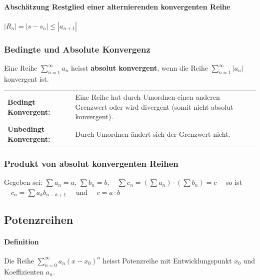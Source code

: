 \paragraph{Abschätzung Restglied einer alternierenden konvergenten Reihe}\qquad $|R_n| = |s-s_n|\leq |a_{n+1}|$


\subsubsection{Bedingte und Absolute Konvergenz}
Eine Reihe $\sum\limits_{n=1}^{\infty}a_n$ heisst \textbf{absolut konvergent}, wenn die
Reihe $\sum\limits_{n=1}^{\infty}|a_n|$ konvergent ist.\\

\begin{tabular}{ p{4.5cm}  p{13.5cm}}
	\textbf{Bedingt Konvergent:} &  Eine Reihe hat durch Umordnen einen anderen Grenzwert oder wird divergent (somit nicht absolut konvergent).\\
	\textbf{Unbedingt Konvergent:} &  Durch Umordnen ändert sich der Grenzwert nicht.\\
\end{tabular}

\subsubsection{Produkt von absolut konvergenten Reihen} 
Gegeben sei: $\sum a_n=a$, \quad $\sum b_n=b, \quad \sum c_n = (\sum a_n) \cdot (\sum b_n) = c \quad $ so ist
$ \quad c_n=\sum a_kb_{n-k+1} \quad $ und $ \quad c = a \cdot b $



\subsection{Potenzreihen}

\paragraph{Definition} 
Die Reihe $ \sum\limits_{n=0}^{\infty} a_n (x-x_0)^n $ heisst Potenzreihe mit Entwicklungspunkt $x_0$ und Koeffizienten $a_n$.

